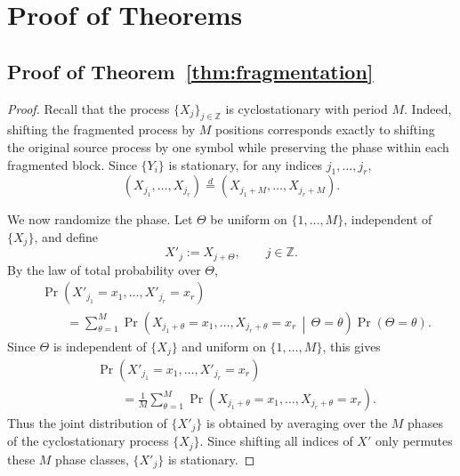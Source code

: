 \documentclass{article}
\theoremstyle{plain}
\theoremstyle{definition}
\theoremstyle{remark}
\begin{document}
    
    
    \newpage
    \appendix
    
    \section{Proof of Theorems}
    \subsection{Proof of Theorem~\ref{thm:fragmentation}}
    \label{proof:fragmentation}
    
    \begin{proof}
    Recall that the process \(\{X_j\}_{j\in\mathbb Z}\) is cyclostationary with
    period \(M\). Indeed, shifting the fragmented process by \(M\) positions
    corresponds exactly to shifting the original source process by one symbol while
    preserving the phase within each fragmented block. Since \(\{Y_i\}\) is
    stationary, for any indices \(j_1,\ldots,j_r\),
    \[
        (X_{j_1},\ldots,X_{j_r})
        \overset{d}{=}
        (X_{j_1+M},\ldots,X_{j_r+M}).
    \]
    
    We now randomize the phase. Let \(\Theta\) be uniform on
    \(\{1,\ldots,M\}\), independent of \(\{X_j\}\), and define
    \[
        X'_j := X_{j+\Theta},
        \qquad j\in\mathbb Z.
    \]
    By the law of total probability over \(\Theta\),
    \begin{align*}
    &\Pr\!\left(
        X'_{j_1}=x_1,\ldots,X'_{j_r}=x_r
    \right) \\
    &\qquad =
    \sum_{\theta=1}^{M}
    \Pr\!\left(
        X_{j_1+\theta}=x_1,\ldots,X_{j_r+\theta}=x_r
        \,\middle|\, \Theta=\theta
    \right)
    \Pr(\Theta=\theta).
    \end{align*}
    Since \(\Theta\) is independent of \(\{X_j\}\) and uniform on
    \(\{1,\ldots,M\}\), this gives
    \begin{align*}
    &\Pr\!\left(
        X'_{j_1}=x_1,\ldots,X'_{j_r}=x_r
    \right) \\
    &\qquad =
    \frac{1}{M}
    \sum_{\theta=1}^{M}
    \Pr\!\left(
        X_{j_1+\theta}=x_1,\ldots,X_{j_r+\theta}=x_r
    \right).
    \end{align*}
    Thus the joint distribution of \(\{X'_j\}\) is obtained by
    averaging over the \(M\) phases of the cyclostationary process
    \(\{X_j\}\). Since shifting all indices of \(X'\) only permutes these \(M\)
    phase classes, \(\{X'_j\}\) is stationary.
    

\end{proof}
\end{document}
